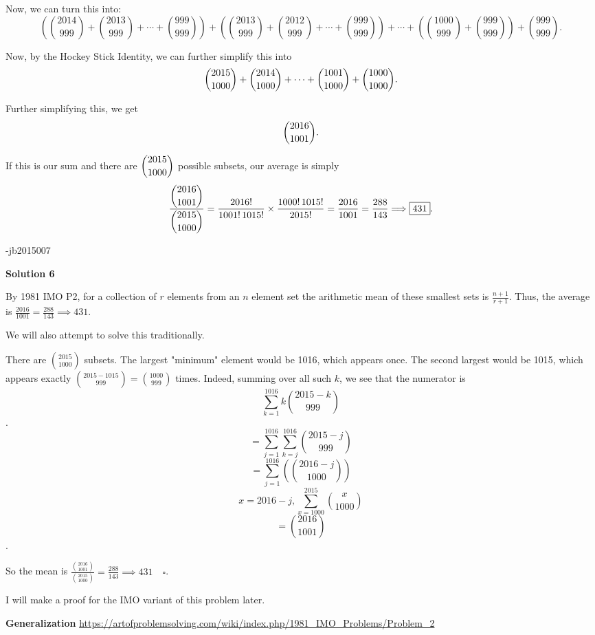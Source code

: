 \begin{enumerate}
 Now, we can turn this into:
 \[\left( \binom{2014}{999} + \binom{2013}{999} + \cdots + \binom{999}{999} \right) + \left( \binom{2013}{999} + \binom{2012}{999} + \cdots + \binom{999}{999} \right) + \cdots + \left( \binom{1000}{999} + \binom{999}{999} \right) + \binom{999}{999}.\]

 Now, by the Hockey Stick Identity, we can further simplify this into
 \[\dbinom{2015}{1000} + \dbinom{2014}{1000} + \cdots + \dbinom{1001}{1000} + \dbinom{1000}{1000}.\]

 Further simplifying this, we get
 \[\dbinom{2016}{1001}.\]

 If this is our sum and there are $\dbinom{2015}{1000}$ possible subsets, our average is simply
 \[\dfrac{\dbinom{2016}{1001}}{\dbinom{2015}{1000}} = \dfrac{2016!}{1001!\,1015!} \times \dfrac{1000!\,1015!}{2015!} = \dfrac{2016}{1001} = \dfrac{288}{143} \Longrightarrow \boxed{431}.\]

 -jb2015007

 



\textbf{Solution 6}

By 1981 IMO P2, for a collection of $r$ elements from an $n$ element set the arithmetic mean of these smallest sets is $\frac{n+1}{r+1}$. Thus, the average is $\frac{2016}{1001} = \frac{288}{143} \implies \boxed{431}$.

 We will also attempt to solve this traditionally.

 There are $\binom{2015}{1000}$ subsets. The largest "minimum" element would be 1016, which appears once. The second largest would be 1015, which appears exactly $\binom{2015-1015}{999} = \binom{1000}{999}$ times. Indeed, summing over all such $k$, we see that the numerator is
 \[\sum_{k=1}^{1016} k\binom{2015-k}{999}\].
 \[= \sum_{j=1}^{1016} \sum_{k=j}^{1016} \binom{2015-j}{999}\]
 \[= \sum_{j=1}^{1016} (\binom{2016-j}{1000})\]
 \[x = 2016-j, \sum_{x=1000}^{2015} \binom{x}{1000}\]
 \[= \binom{2016}{1001}\].

 So the mean is $\frac{\binom{2016}{1001}}{\binom{2015}{1000}} = \frac{288}{143} \implies \boxed{431} \quad \square$.

 I will make a proof for the IMO variant of this problem later.

 \textbf{Generalization} \href{https://artofproblemsolving.com/wiki/index.php/1981\_IMO\_Problems/Problem\_2}{https://artofproblemsolving.com/wiki/index.php/1981\_IMO\_Problems/Problem\_2}

 



\end{enumerate}
